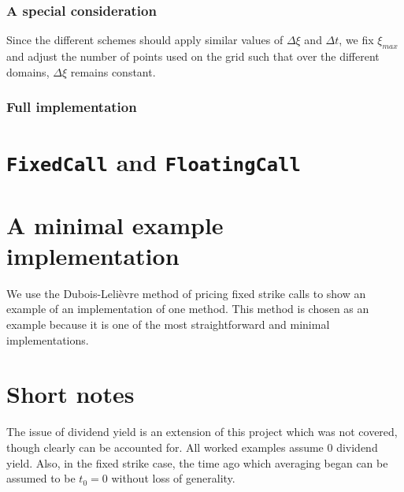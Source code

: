 \documentclass[12pt]{report}
\begin{document}
\subsubsection{A special consideration}
Since the different schemes should apply similar values of \(\Delta\xi\) and \(\Delta t\), we fix \(\xi_{max}\) and adjust the number of points used on the grid such that over the different domains, \(\Delta\xi\) remains constant.

\subsubsection{Full implementation}
\scriptsize

\normalsize

\section{\texttt{FixedCall} and \texttt{FloatingCall}}

\scriptsize

\normalsize

\scriptsize

\normalsize

\section{A minimal example implementation}

We use the Dubois-Leli\`{e}vre method of pricing fixed strike calls to show an example of an implementation of one method. This method is chosen as an example because it is one of the most straightforward and minimal implementations.
\scriptsize

\normalsize

\section{Short notes}
The issue of dividend yield is an extension of this project which was not covered, though clearly can be accounted for. All worked examples assume 0 dividend yield. Also, in the fixed strike case, the time ago which averaging began can be assumed to be \(t_0 = 0\) without loss of generality.
\end{document}

